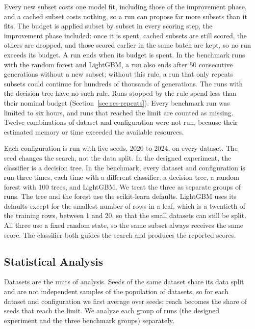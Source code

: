 Every new subset costs one model fit, including those of the improvement phase, and a cached subset costs nothing, so a run can propose far more subsets than it fits. The budget is applied subset by subset in every scoring step, the improvement phase included: once it is spent, cached subsets are still scored, the others are dropped, and those scored earlier in the same batch are kept, so no run exceeds its budget. A run ends when its budget is spent. In the benchmark runs with the random forest and LightGBM, a run also ends after 50 consecutive generations without a new subset; without this rule, a run that only repeats subsets could continue for hundreds of thousands of generations. The runs with the decision tree have no such rule. Runs stopped by the rule spend less than their nominal budget (Section~\ref{sec:res-repeats}). Every benchmark run was limited to six hours, and runs that reached the limit are counted as missing. Twelve combinations of dataset and configuration were not run, because their estimated memory or time exceeded the available resources.

Each configuration is run with five seeds, 2020 to 2024, on every dataset. The seed changes the search, not the data split. In the designed experiment, the classifier is a decision tree. In the benchmark, every dataset and configuration is run three times, each time with a different classifier: a decision tree, a random forest with 100 trees, and LightGBM. We treat the three as separate groups of runs. The tree and the forest use the scikit-learn defaults. LightGBM uses its defaults except for the smallest number of rows in a leaf, which is a twentieth of the training rows, between 1 and 20, so that the small datasets can still be split. All three use a fixed random state, so the same subset always receives the same score. The classifier both guides the search and produces the reported scores.

\subsection{Statistical Analysis}
\label{sec:statistics}

Datasets are the units of analysis. Seeds of the same dataset share its data split and are not independent samples of the population of datasets, so for each dataset and configuration we first average over seeds; reach becomes the share of seeds that reach the limit. We analyze each group of runs (the designed experiment and the three benchmark groups) separately.

